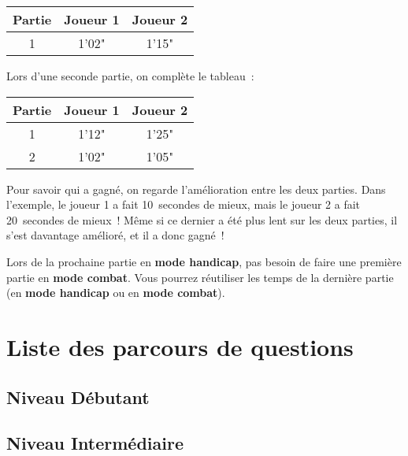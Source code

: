 \documentclass[11pt]{article}
\newcommand{\mode}[1]
{\textbf{#1}}
\begin{document}
\begin{tabular}{ | *{3}{c|} }
    \hline
    Partie & Joueur 1 & Joueur 2 \\
    \hline
    1 & 1'02" & 1'15" \\
    \hline
\end{tabular}

Lors d’une seconde partie, on complète le tableau :

\begin{tabular}{ | *{3}{c|} }
    \hline
    Partie & Joueur 1 & Joueur 2 \\
    \hline
    1 & 1'12" & 1'25" \\
    \hline
    2 & 1'02" & 1'05" \\
    \hline
\end{tabular}

Pour savoir qui a gagné, on regarde l’amélioration entre les deux parties.
Dans l’exemple, le joueur 1 a fait 10 secondes de mieux, mais le joueur 2 a
fait 20 secondes de mieux ! Même si ce dernier a été plus lent sur les deux
parties, il s’est davantage amélioré, et il a donc gagné !

Lors de la prochaine partie en \mode{mode handicap}, pas besoin de faire une
première partie en \mode{mode combat}. Vous pourrez réutiliser les temps de la
dernière partie (en \mode{mode handicap} ou en \mode{mode combat}).

\section{Liste des parcours de questions} \label{parcours}

\subsection{Niveau Débutant}


\subsection{Niveau Intermédiaire}
\end{document}
